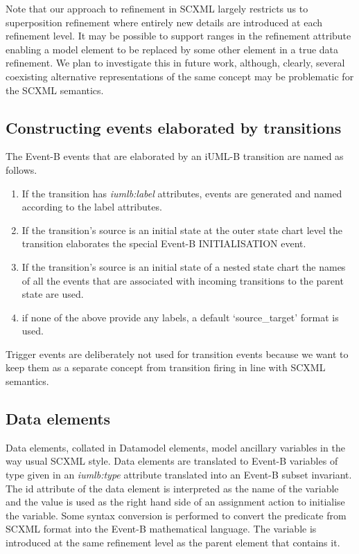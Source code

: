 Note that our approach to refinement in SCXML largely restricts us to superposition refinement where entirely new details are introduced at each refinement level.  It may be possible to support ranges in the refinement attribute enabling a model element to be replaced by some other element in a true data refinement. We plan to investigate this in future work, although, clearly, several coexisting alternative representations of the same concept may be problematic for the SCXML semantics.

\subsection{Constructing events elaborated by transitions}
The Event-B events that are elaborated by an iUML-B  transition are named as follows. 

\begin{enumerate}
\item If the transition has \emph{iumlb:label} attributes, events are generated and named according to the label attributes.
\item If the transition's source is an initial state at the outer state  chart level the transition elaborates the special Event-B INITIALISATION event. 
\item If the transition's source is an initial state of a nested state  chart the names of all the events that are associated with  incoming transitions to the parent state are used.
\item if none of the above provide any labels, a default  `source\_target' format is used.
\end{enumerate}

Trigger events are deliberately not used for  transition events because we want to keep them as a 
separate concept from transition firing in line with SCXML semantics.

\subsection{Data elements}
Data elements, collated in Datamodel elements, model ancillary variables in the way usual SCXML style. Data elements are translated to Event-B variables of type given in an \emph{iumlb:type} attribute translated into an Event-B subset invariant.  The id attribute of the data element is interpreted as the name of the variable and the value is used as the right hand side of an assignment action to initialise the variable.  Some syntax conversion is performed to convert the predicate from SCXML  format into the Event-B mathematical language. The variable is introduced at the same refinement level as the parent element that contains it.


